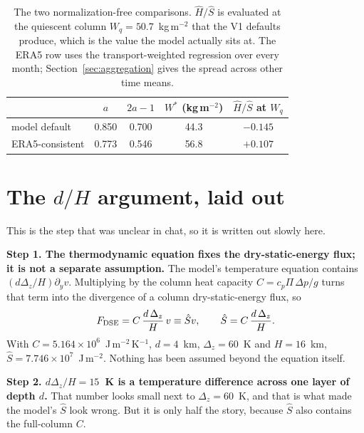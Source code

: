 \documentclass[11pt]{article}
\newcommand{\py}{\partial_y}
\newcommand{\Shat}{\hat S}
\newcommand{\Hhat}{\hat H}
\newcommand{\Wq}{W_q}
\newcommand{\Wstar}{W^*}
\begin{document}
\begin{table}[htbp]
\centering
\caption{The two normalization-free comparisons. $\Hhat/\Shat$ is evaluated at
the quiescent column $\Wq = 50.7$~kg\,m$^{-2}$ that the V1 defaults produce,
which is the value the model actually sits at. The ERA5 row uses the
transport-weighted regression over every month; Section~\ref{sec:aggregation}
gives the spread across other time means.}
\label{tab:invariant}
\begin{tabular}{lcccc}
\toprule
& $a$ & $2a-1$ & $\Wstar$ (kg\,m$^{-2}$) & $\Hhat/\Shat$ at $\Wq$ \\
\midrule
model default        & 0.850 & 0.700 & 44.3 & $-0.145$ \\
ERA5-consistent      & 0.773 & 0.546 & 56.8 & $+0.107$ \\
\bottomrule
\end{tabular}
\end{table}

\section{The $d/H$ argument, laid out}
\label{sec:dh}

This is the step that was unclear in chat, so it is written out slowly here.

\textbf{Step 1. The thermodynamic equation fixes the dry-static-energy flux; it
is not a separate assumption.} The model's temperature equation contains
$(d\Delta_z/H)\py v$. Multiplying by the column heat capacity
$C = c_p \Pi\, \Delta p/g$ turns that term into the divergence of a column
dry-static-energy flux, so
%
\begin{equation}
F_{\rm DSE} = C\,\frac{d\,\Delta_z}{H}\,v \equiv \Shat v,
\qquad
\Shat = C\,\frac{d\,\Delta_z}{H}.
\label{eq:shatmodel}
\end{equation}
%
With $C = 5.164\times10^{6}$~J\,m$^{-2}$\,K$^{-1}$, $d = 4$~km,
$\Delta_z = 60$~K and $H = 16$~km, $\Shat = 7.746\times10^{7}$~J\,m$^{-2}$.
Nothing has been assumed beyond the equation itself.

\textbf{Step 2. $d\Delta_z/H = 15$~K is a temperature difference across one
layer of depth $d$.} That number looks small next to $\Delta_z = 60$~K, and
that is what made the model's $\Shat$ look wrong. But it is only half the
story, because $\Shat$ also contains the full-column $C$.
\end{document}
